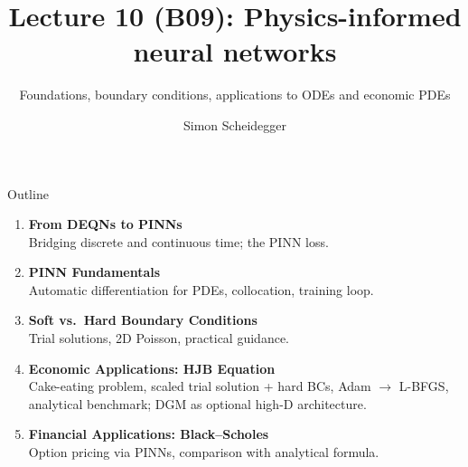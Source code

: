 \documentclass[aspectratio=169,11pt]{beamer}
\title[Lecture 10 (B09)]{Lecture 10 (B09): Physics-informed neural networks}
\subtitle{Foundations, boundary conditions, applications to ODEs and economic PDEs}
\author{Simon Scheidegger}
\institute{HEC, University of Lausanne}
\date{}
\begin{document}
\providecommand{\exercisepause}{%
  \tikz[baseline=(X.base)]{\node[fill=darkgreen!80!black, text=white,
  rounded corners=2pt, inner sep=3pt, font=\scriptsize\bfseries](X){PAUSE};}}

{
\begin{frame}
\titlepage
\end{frame}
}


\begin{frame}{Outline}
\begin{enumerate}
    \item \textbf{From DEQNs to PINNs}\\
    {\small Bridging discrete and continuous time; the PINN loss.}

    \vspace{0.4em}
    \item \textbf{PINN Fundamentals}\\
    {\small Automatic differentiation for PDEs, collocation, training loop.}

    \vspace{0.4em}
    \item \textbf{Soft vs.\ Hard Boundary Conditions}\\
    {\small Trial solutions, 2D Poisson, practical guidance.}

    \vspace{0.4em}
    \item \textbf{Economic Applications: HJB Equation}\\
    {\small Cake-eating problem, scaled trial solution + hard BCs, Adam $\to$ L-BFGS, analytical benchmark; DGM as optional high-D architecture.}

    \vspace{0.4em}
    \item \textbf{Financial Applications: Black--Scholes}\\
    {\small Option pricing via PINNs, comparison with analytical formula.}
\end{enumerate}
\end{frame}
\end{document}
